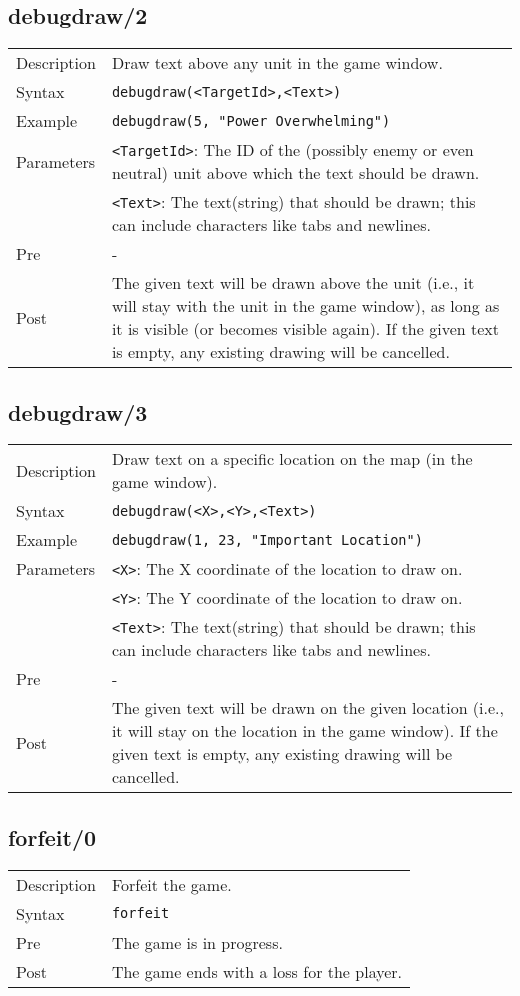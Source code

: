 \subsection{debugdraw/2}
\begin{tabularx}{\textwidth}{lX}
 Description & Draw text above any unit in the game window. \\
 Syntax & \verb|debugdraw(<TargetId>,<Text>)| \\
 Example & \verb|debugdraw(5, "Power Overwhelming")| \\
 Parameters & \verb|<TargetId>|: The ID of the (possibly enemy or even neutral) unit above which the text should be drawn. \\
 			& \verb|<Text>|: The text(string) that should be drawn; this can include characters like tabs and newlines.  \\
 Pre & - \\
 Post & The given text will be drawn above the unit (i.e., it will stay with the unit in the game window), as long as it is visible (or becomes visible again). If the given text is empty, any existing drawing will be cancelled.
\end{tabularx}

\subsection{debugdraw/3}
\begin{tabularx}{\textwidth}{lX}
 Description & Draw text on a specific location on the map (in the game window). \\
 Syntax & \verb|debugdraw(<X>,<Y>,<Text>)| \\
 Example & \verb|debugdraw(1, 23, "Important Location")| \\
 Parameters & \verb|<X>|: The X coordinate of the location to draw on. \\
 			& \verb|<Y>|: The Y coordinate of the location to draw on.  \\
 			& \verb|<Text>|: The text(string) that should be drawn; this can include characters like tabs and newlines.  \\
 Pre & - \\
 Post & The given text will be drawn on the given location (i.e., it will stay on the location in the game window). If the given text is empty, any existing drawing will be cancelled.
\end{tabularx}

\subsection{forfeit/0}
\begin{tabularx}{\textwidth}{lX}
 Description & Forfeit the game. \\
 Syntax & \verb|forfeit| \\
 Pre & The game is in progress. \\
 Post & The game ends with a loss for the player.
\end{tabularx}

